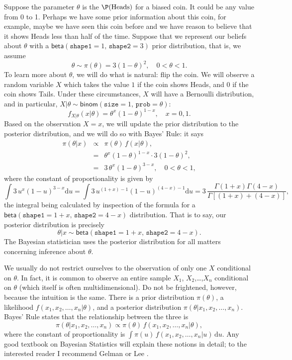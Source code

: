 \documentclass[captions=tableheading]{scrbook}
\begin{document}
\begin{example}
Suppose the parameter \(\theta\) is the \(\P(\mbox{Heads})\) for a biased coin. It could be any value from 0 to 1. Perhaps we have some prior information about this coin, for example, maybe we have seen this coin before and we have reason to believe that it shows Heads less than half of the time. Suppose that we represent our beliefs about \(\theta\) with a \(\mathsf{beta}(\mathtt{shape1}=1,\,\mathtt{shape2}=3)\) prior distribution, that is, we assume 
\[
\theta\sim\pi(\theta)=3(1-\theta)^{2},\quad0<\theta<1.
\]
To learn more about \(\theta\), we will do what is natural: flip the coin. We will observe a random variable \(X\) which takes the value \(1\) if the coin shows Heads, and 0 if the coin shows Tails. Under these circumstances, \(X\) will have a Bernoulli distribution, and in particular, \(X|\theta\sim\mathsf{binom}(\mathtt{size}=1,\,\mathtt{prob}=\theta)\):
\[ 
f_{X|\theta}(x|\theta)=\theta^{x}(1-\theta)^{1-x},\quad x=0,1.
\]
Based on the observation \(X=x\), we will update the prior distribution to the posterior distribution, and we will do so with Bayes' Rule: it says
\begin{eqnarray*}
\pi(\theta|x) & \propto & \pi(\theta)\, f(x|\theta),\\
 & = & \theta^{x}(1-\theta)^{1-x}\cdot3(1-\theta)^{2},\\
 & = & 3\,\theta^{x}(1-\theta)^{3-x},\quad0<\theta<1,
\end{eqnarray*}
where the constant of proportionality is given by
\[
\int3\, u^{x}(1-u)^{3-x}\mathrm{d} u=\int3\, u^{(1+x)-1}(1-u)^{(4-x)-1}\mathrm{d} u=3\,\frac{\Gamma(1+x)\Gamma(4-x)}{\Gamma[(1+x)+(4-x)]},
\]
the integral being calculated by inspection of the formula for a \(\mathsf{beta}(\mathtt{shape1}=1+x,\,\mathtt{shape2}=4-x)\) distribution. That is to say, our posterior distribution is precisely
\[
\theta|x\sim\mathsf{beta}(\mathtt{shape1}=1+x,\,\mathtt{shape2}=4-x).
\]
The Bayesian statistician uses the posterior distribution for all matters concerning inference about \(\theta\).

\end{example}

\begin{rem}
We usually do not restrict ourselves to the observation of only one \(X\) conditional on \(\theta\). In fact, it is common to observe an entire sample \(X_{1}\), \(X_{2}\),\ldots{},\(X_{n}\) conditional on \(\theta\) (which itself is often multidimensional). Do not be frightened, however, because the intuition is the same. There is a prior distribution \(\pi(\theta)\), a likelihood \(f(x_{1},x_{2},\ldots,x_{n}|\theta)\), and a posterior distribution \(\pi(\theta|x_{1},x_{2},\ldots,x_{n})\). Bayes' Rule states that the relationship between the three is
\[
\pi(\theta|x_{1},x_{2},\ldots,x_{n})\propto\pi(\theta)\, f(x_{1},x_{2},\ldots,x_{n}|\theta),
\]
where the constant of proportionality is \(\int\pi(u)\, f(x_{1},x_{2},\ldots,x_{n}|u)\,\mathrm{d} u\). Any good textbook on Bayesian Statistics will explain these notions in detail; to the interested reader I recommend Gelman \cite{Gelman2004} or Lee \cite{Lee1997}.
\end{rem}
\end{document}
